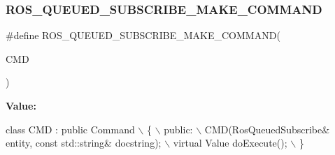 \subsubsection{\texorpdfstring{R\+O\+S\+\_\+\+Q\+U\+E\+U\+E\+D\+\_\+\+S\+U\+B\+S\+C\+R\+I\+B\+E\+\_\+\+M\+A\+K\+E\+\_\+\+C\+O\+M\+M\+A\+ND}{ROS\_QUEUED\_SUBSCRIBE\_MAKE\_COMMAND}}
{\footnotesize\ttfamily \#define R\+O\+S\+\_\+\+Q\+U\+E\+U\+E\+D\+\_\+\+S\+U\+B\+S\+C\+R\+I\+B\+E\+\_\+\+M\+A\+K\+E\+\_\+\+C\+O\+M\+M\+A\+ND(\begin{DoxyParamCaption}\item[{}]{C\+MD }\end{DoxyParamCaption})}

{\bfseries Value\+:}
\begin{DoxyCode}
\textcolor{keyword}{class }CMD : \textcolor{keyword}{public} Command                                         \(\backslash\)
    \{                                                                  \(\backslash\)
    public:                                                            \(\backslash\)
        CMD(RosQueuedSubscribe& entity, \textcolor{keyword}{const} std::string& docstring); \(\backslash\)
        virtual Value doExecute();                                     \(\backslash\)
    \}
\end{DoxyCode}
